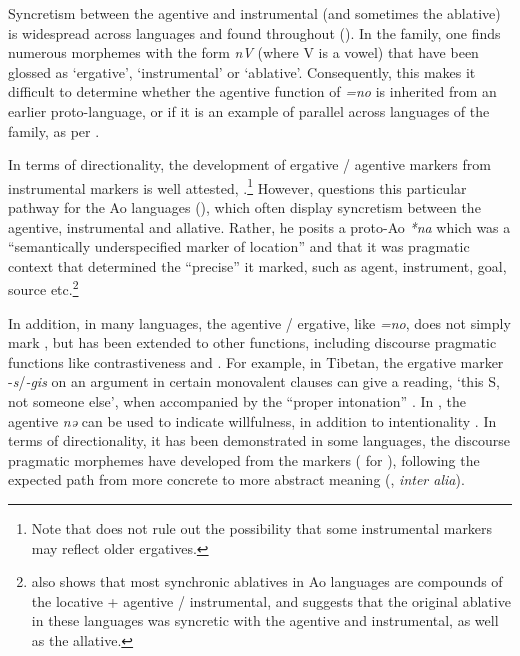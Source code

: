 \documentclass[output=paper]{LSP/langsci}
\begin{document}
Syncretism between the agentive and instrumental (and sometimes the ablative) is widespread across languages \citep{Garrett1990Origin} and found throughout  (\citealt{DeLancey1984Etymological,LaPolla1995Ergative,Noonan2009Patterns}). In the family, one finds numerous morphemes with the form \textit{nV} (where V is a vowel) that have been glossed as ‘ergative’, ‘instrumental’ or ‘ablative’. Consequently, this makes it difficult to determine whether the agentive function of  \textit{=no} is inherited from an earlier proto-language, or if it is an example of parallel  across languages of the family, as per \citet{LaPolla1995Ergative}.

In terms of directionality, the development of ergative / agentive markers from instrumental markers is well attested, \eg \citet{Garrett1990Origin}.\footnote{Note that \citet{Garrett1990Origin} does not rule out the possibility that some instrumental markers may reflect older ergatives.} However, \citet{Coupe2011Pragmatic} questions this particular pathway for the Ao languages (), which often display syncretism between the agentive, instrumental and allative. Rather, he posits a proto-Ao \textit{*na} which was a “semantically underspecified marker of location” and that it was pragmatic context that determined the “precise”  it marked, such as agent, instrument, goal, source etc.\footnote{\citet{Coupe2011Pragmatic} also shows that most synchronic ablatives in Ao languages are compounds of the locative + agentive / instrumental, and suggests that the original ablative in these languages was syncretic with the agentive and instrumental, as well as the allative.} 

In addition, in many  languages, the agentive / ergative, like  \textit{=no}, does not simply mark , but has been extended to other functions, including discourse pragmatic functions like contrastiveness and . For example, in  Tibetan, the ergative marker -\textit{s}/\textit{-gis} on an argument in certain monovalent clauses can give a  reading, \ie ‘this S, not someone else’, when accompanied by the “proper intonation” \citep{Tournadre1991Rhetorical}. In , the agentive \textit{nə} can be used to indicate willfulness, in addition to intentionality \citep[157]{Coupe2007Grammar}. In terms of directionality, it has been demonstrated in some languages, the discourse pragmatic morphemes have developed from the  markers (\eg \citealt{Chelliah2009Semantic} for ), following the expected path from more concrete to more abstract meaning (\citealt{Heineetal2002World}, \textit{inter alia}).
\end{document}
